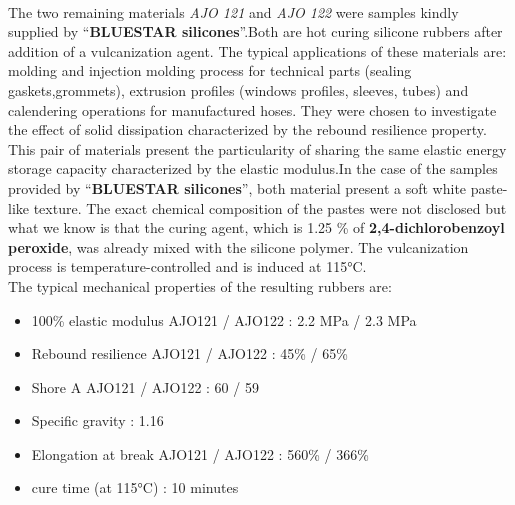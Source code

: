 \paragraph{}
The two remaining materials \emph{AJO 121} and \emph{AJO 122} were samples kindly supplied by "`\textbf{BLUESTAR silicones\textcopyright}"'.Both are hot curing silicone rubbers after addition of a vulcanization agent. The typical applications of these materials are: molding and injection molding process for technical parts (sealing gaskets,grommets), extrusion profiles (windows profiles, sleeves, tubes) and calendering operations for manufactured hoses. They were chosen to investigate the effect of solid dissipation characterized by the rebound resilience property. This pair of materials present the particularity of sharing the same elastic energy storage capacity characterized by the elastic modulus.In the case of the samples provided by "`\textbf{BLUESTAR silicones\textcopyright}"', both material present a soft white paste-like texture. The exact chemical composition of the pastes were not disclosed but what we know is that the curing agent, which is 1.25 \% of \textbf{2,4-dichlorobenzoyl peroxide}, was already mixed with the silicone polymer. The vulcanization process is temperature-controlled and is induced at 115°C.\\

The typical mechanical properties of the resulting rubbers are:
\begin{itemize}
	\item 100\% elastic modulus AJO121 / AJO122 : 2.2 MPa / 2.3 MPa
	\item Rebound resilience AJO121 / AJO122 : 45\% / 65\%
	\item Shore A AJO121 / AJO122 : 60 / 59 
	\item Specific gravity : 1.16
	\item Elongation at break AJO121 / AJO122 : 560\% / 366\%
	\item cure time (at 115°C) : 10 minutes
\end{itemize}

